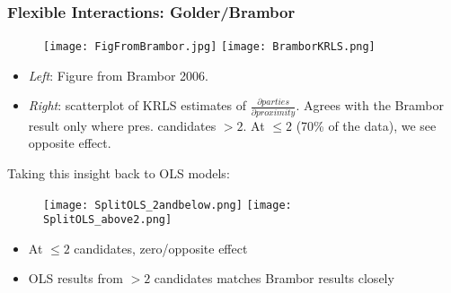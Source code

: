 \documentclass{beamer}
\numberwithin{equation}{section}
\begin{document}
\begin{frame}[fragile]
%
%
\end{frame}

\begin{frame}
\frametitle{Flexible Interactions: Golder/Brambor}
\begin{figure}[!hbt]
\centering
\texttt{[image: FigFromBrambor.jpg]}
\texttt{[image: BramborKRLS.png]}
\end{figure}

\begin{itemize}
\item<1-> \scriptsize{\emph{Left}: Figure from Brambor 2006.}\\
\smallskip
\item<2-> \scriptsize{\emph{Right}: scatterplot of KRLS estimates of $\frac{\partial parties}{\partial proximity}$. Agrees with the Brambor result only where pres. candidates $>2$. At $\leq2$ (70\% of the data), we see opposite effect.}
\end{itemize}
\end{frame}

\begin{frame}
\small{Taking this insight back to OLS models:}
\begin{figure}[!hbt]
\centering
\texttt{[image: SplitOLS\_2andbelow.png]}
\texttt{[image: SplitOLS\_above2.png]}
\end{figure}
\begin{itemize}
\item \footnotesize{At $\leq2$ candidates, zero/opposite effect}
\item \footnotesize{OLS results from $>2$ candidates matches Brambor results closely}

\end{itemize}
\end{frame}
\end{document}
